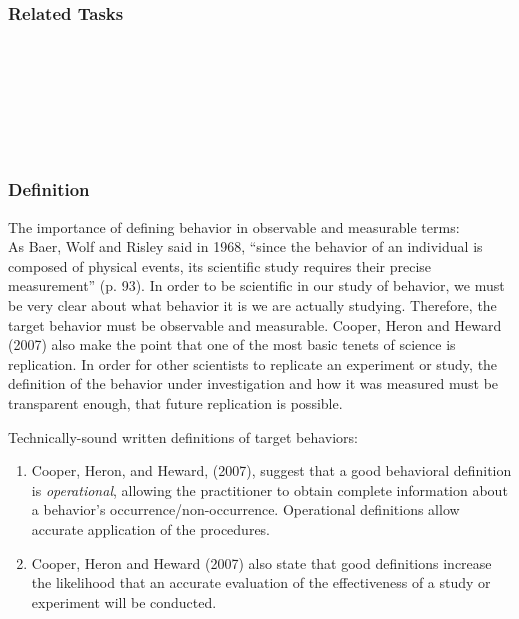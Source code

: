 \subsection{Related Tasks} 
\fourhOne{}\\
\fourhFour{}\\
\fouriFive{}\\
\fourjFifteen{}\\
\fourFKFourtySeven{}\\
%
%
%
%
%
%
%
%
\chapter{\fourseci{}}
%
\section[\fouriOne{}]{\fouriOne{}%
              }
\subsection{Definition}
The importance of defining behavior in observable and measurable terms:\\
As Baer, Wolf and Risley said in 1968, ``since the behavior of an individual is composed of physical events, its scientific study requires their precise measurement'' (p. 93). In order to be scientific in our study of behavior, we must be very clear about what behavior it is we are actually studying. Therefore, the target behavior must be observable and measurable. Cooper, Heron and Heward (2007) also make the point that one of the most basic tenets of science is replication. In order for other scientists to replicate an experiment or study, the definition of the behavior under investigation and how it was measured must be transparent enough, that future replication is possible.

Technically-sound written definitions of target behaviors:\\
\begin{enumerate}
\item Cooper, Heron, and Heward, (2007), suggest that a good behavioral definition is \textit{operational}, allowing the practitioner to obtain complete information about a behavior's occurrence/non-occurrence. Operational definitions allow accurate application of the procedures.
\item Cooper, Heron and Heward (2007) also state that good definitions increase the likelihood that an accurate evaluation of the effectiveness of a study or experiment will be conducted.
\end{enumerate}

